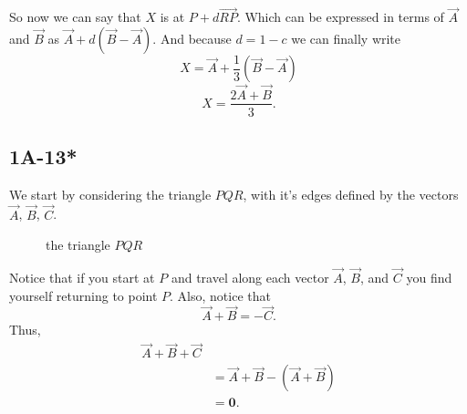 \documentclass[main.tex]{subfiles}
\begin{document}
So now we can say that $X$ is at $P + d\vec{RP}$.
 Which can be expressed in terms of $\vec{A}$ and $\vec{B}$ as
 $\vec{A} + d(\vec{B} - \vec{A})$. And because $d = 1-c$ we can
 finally write \[X = \vec{A} + \frac{1}{3}(\vec{B} - \vec{A})\]
 \[X = \frac{2\vec{A} + \vec{B}}{3}.\]


\subsection*{1A-13*}

We start by considering the triangle $PQR$,
with it's edges defined by the vectors $\vec{A}$, $\vec{B}$, $\vec{C}$.


\begin{figure}[!h]
\centering
{}
\caption{the triangle $PQR$}
\end{figure}

Notice that if you start at $P$ and travel along each vector $\vec{A}$, $\vec{B}$,
and $\vec{C}$ you find yourself returning to point $P$. Also, notice that
\[\vec{A} + \vec{B} = -\vec{C}.\]
Thus,
\begin{align*}
\vec{A} + \vec{B} + \vec{C}\\ &= \vec{A} + \vec{B}  - (\vec{A} + \vec{B})\\
&= \mathbf{0}.
\end{align*}
\end{document}
